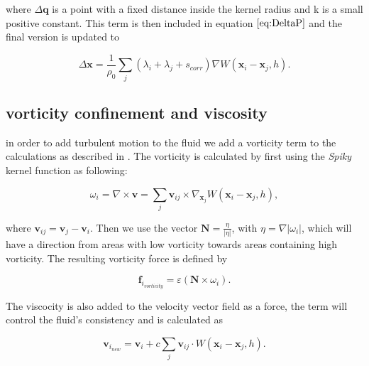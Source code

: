 where $\Delta \mathbf{q}$ is a point with a fixed distance inside the kernel
radius and k is a small positive constant. This term is then included in
equation $\ref{eq:DeltaP}$ and the final version is updated to

\begin{equation}
\label{eq:DeltaPscorr}
\Delta \mathbf{x} = \frac{1}{\rho_0} \sum\limits_{j} (\lambda_i + \lambda_j + s_{corr}) \nabla W(\mathbf{x}_i - \mathbf{x}_j, h).
\end{equation}

\subsection{vorticity confinement and viscosity} in order to add turbulent
motion to the fluid we add a vorticity term to the calculations as described in
\cite{macklin2013position}. The vorticity is calculated by first using the
\textit{Spiky} kernel function as following:

\begin{equation}
\label{eq:Omega}
\omega_{i} = \nabla \times \mathbf{v} =  \sum\limits_{j} \mathbf{v}_{ij} \times \nabla_{\mathbf{x}_{j}} W(\mathbf{x}_{i} - \mathbf{x}_{j}, h),
\end{equation}

where $\mathbf{v}_{ij} = \mathbf{v}_{j} - \mathbf{v}_{i}$. Then we use the
vector $\mathbf{N} = \frac{\eta}{|\eta|}$, with $\eta = \nabla|\omega_{i}|$,
which will have a direction from areas with low vorticity towards areas
containing high vorticity. The resulting vorticity force is defined by

\begin{equation}
\label{eq:Vorticity}
\mathbf{f}_{i_{vorticity}} = \varepsilon \left(\mathbf{N} \times \omega_{i} \right).
\end{equation}

The viscocity is also added to the velocity vector field as a force, the term
will control the fluid's consistency and is calculated as

\begin{equation}
\label{eq:Viscosity}
\mathbf{v}_{i_{new}} = \mathbf{v}_{i} + c \sum\limits_{j} \mathbf{v}_{ij} \cdot W(\mathbf{x}_i - \mathbf{x}_j, h).
\end{equation}

